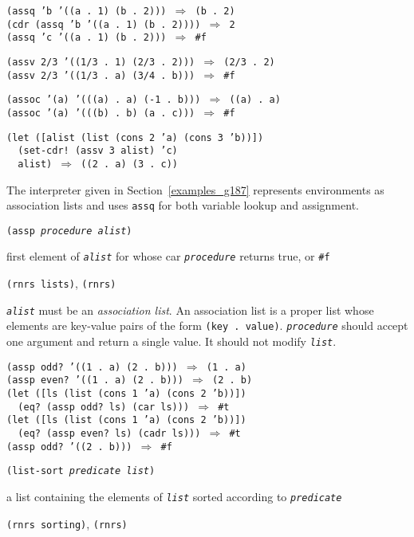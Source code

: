 \begin{alltt}
(assq 'b '((a . 1) (b . 2))) \(\Rightarrow\) (b . 2)
(cdr (assq 'b '((a . 1) (b . 2)))) \(\Rightarrow\) 2
(assq 'c '((a . 1) (b . 2))) \(\Rightarrow\) \#{}f

(assv 2/3 '((1/3 . 1) (2/3 . 2))) \(\Rightarrow\) (2/3 . 2)
(assv 2/3 '((1/3 . a) (3/4 . b))) \(\Rightarrow\) \#{}f

(assoc '(a) '(((a) . a) (-1 . b))) \(\Rightarrow\) ((a) . a)
(assoc '(a) '(((b) . b) (a . c))) \(\Rightarrow\) \#{}f

(let ([alist (list (cons 2 'a) (cons 3 'b))])
  (set-cdr! (assv 3 alist) 'c)
  alist) \(\Rightarrow\) ((2 . a) (3 . c))
\end{alltt}


The interpreter given in Section \ref{examples_g187} represents
environments as association lists and uses \texttt{assq} for both
variable lookup and assignment.

\begin{description}

\label{objects_s60}\item[procedure] \texttt{(assp \textit{procedure} \textit{alist})}



\item[returns] first element of \texttt{\textit{alist}} for whose car \texttt{\textit{procedure}} returns true, or \texttt{\#{}f}


\item[libraries] \texttt{(rnrs lists)}, \texttt{(rnrs)}
\end{description}


\label{objects_s61}\texttt{\textit{alist}} must be an \textit{association list}.
An association list is a proper list whose elements are key-value pairs
of the form \texttt{(key . value)}.
\texttt{\textit{procedure}} should accept one argument and return a single value.
It should not modify \texttt{\textit{list}}.


\begin{alltt}
(assp odd? '((1 . a) (2 . b))) \(\Rightarrow\) (1 . a)
(assp even? '((1 . a) (2 . b))) \(\Rightarrow\) (2 . b)
(let ([ls (list (cons 1 'a) (cons 2 'b))])
  (eq? (assp odd? ls) (car ls))) \(\Rightarrow\) \#{}t
(let ([ls (list (cons 1 'a) (cons 2 'b))])
  (eq? (assp even? ls) (cadr ls))) \(\Rightarrow\) \#{}t
(assp odd? '((2 . b))) \(\Rightarrow\) \#{}f
\end{alltt}

\begin{description}

\label{objects_s62}\item[procedure] \texttt{(list-sort \textit{predicate} \textit{list})}



\item[returns] a list containing the elements of \texttt{\textit{list}} sorted according to \texttt{\textit{predicate}}


\item[libraries] \texttt{(rnrs sorting)}, \texttt{(rnrs)}
\end{description}

